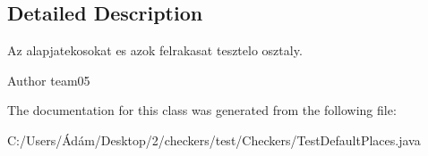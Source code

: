 \subsection{Detailed Description}
Az alapjatekosokat es azok felrakasat tesztelo osztaly. 

\begin{DoxyAuthor}{Author}
team05 
\end{DoxyAuthor}


The documentation for this class was generated from the following file\+:\begin{DoxyCompactItemize}
\item 
C\+:/\+Users/Ádám/\+Desktop/2/checkers/test/\+Checkers/Test\+Default\+Places.\+java\end{DoxyCompactItemize}
